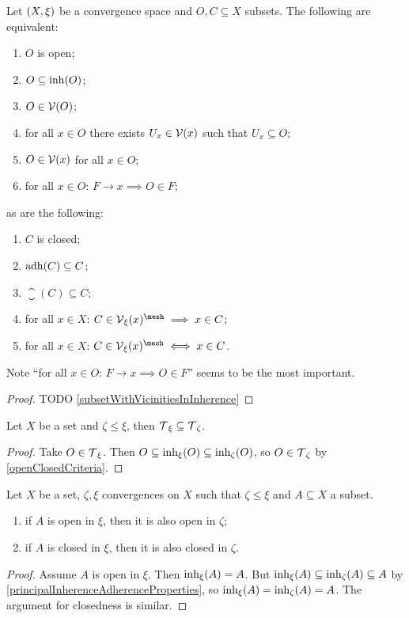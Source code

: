 \begin{lemma} \label{openClosedCriteria}
Let $\sSet{X,\xi}$ be a convergence space and $O,C\subseteq X$ subsets. The following are equivalent:
\begin{enumerate}
\item $O$ is open;
\item $O\subseteq \operatorname{inh}(O)$;
\item $O\in \operatorname{\mathcal{V}}(O)$;
\item for all $x\in O$ there exists $U_x\in \operatorname{\mathcal{V}}(x)$ such that $U_x\subseteq O$;
\item $O\in \operatorname{\mathcal{V}}(x)$ for all $x\in O$;
\item for all $x\in O$: $F\to x \implies O\in F$;
\end{enumerate}
as are the following:
\begin{enumerate}
\item $C$ is closed;
\item $\operatorname{adh}(C)\subseteq C$;
\item $\closure(C)\subseteq C$;
\item for all $x\in X$: $C\in \vicinity_\xi(x)^\mesh \implies x\in C$;
\item for all $x\in X$: $C\in \vicinity_\xi(x)^\mesh \iff x\in C$.
\end{enumerate}
\end{lemma}
Note ``for all $x\in O$: $F\to x \implies O\in F$'' seems to be the most important.
\begin{proof}
TODO \ref{subsetWithVicinitiesInInherence}
\end{proof}

\begin{lemma} \label{topologyMonotoneInConvergence}
Let $X$ be a set and $\zeta \leq \xi$, then $\operatorname{\mathcal{T}}_{\xi} \subseteq \operatorname{\mathcal{T}}_{\zeta}$.
\end{lemma}
\begin{proof}
Take $O\in \operatorname{\mathcal{T}}_{\xi}$. Then $O\subseteq \operatorname{inh}_\xi(O) \subseteq \operatorname{inh}_\zeta(O)$, so $O\in \operatorname{\mathcal{T}}_\zeta$ by \ref{openClosedCriteria}.
\end{proof}

\begin{lemma} \label{openClosedConvergenceInclusions}
Let $X$ be a set, $\zeta, \xi$ convergences on $X$ such that $\zeta\leq\xi$ and $A\subseteq X$ a subset.
\begin{enumerate}
\item if $A$ is open in $\xi$, then it is also open in $\zeta$;
\item if $A$ is closed in $\xi$, then it is also closed in $\zeta$.
\end{enumerate}
\end{lemma}
\begin{proof}
Assume $A$ is open in $\xi$. Then $\operatorname{inh}_\xi(A) = A$. But $\operatorname{inh}_\xi(A) \subseteq \operatorname{inh}_\zeta(A) \subseteq A$ by \ref{principalInherenceAdherenceProperties}, so $\operatorname{inh}_\xi(A) = \operatorname{inh}_\zeta(A) = A$. The argument for closedness is similar.
\end{proof}

